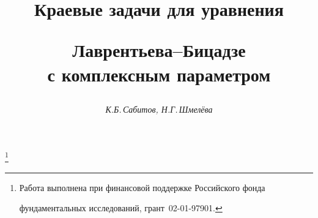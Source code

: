 




%





\newcommand{\sgn}{\operatorname{sgn}}


\newcommand{\mes}{\operatorname{mes}}


\newcommand{\im}{\operatorname{Im}}


\newcommand{\re}{\operatorname{Re}}


\newcommand{\tts}[1]{}







\setcounter{page}{49}















\author{\it К.Б.\,Сабитов, Н.Г.\,Шмел\"ева}




\title{Краевые задачи для уравнения 


Лаврентьева--Бицадзе\\ с комплексным параметром}


\thanks{Работа выполнена при финансовой поддержке Российского фонда


фундаментальных исследований, грант \No\,02-01-97901.}





\date{}




\pagestyle{plain} %





